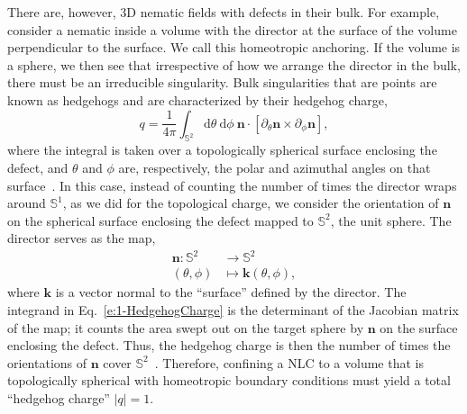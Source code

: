 There are, however, 3D nematic fields with defects in their bulk.
For example, consider a nematic inside a volume with the director at the surface of the volume perpendicular to the surface.
We call this homeotropic anchoring.
If the volume is a sphere, we then see that irrespective of how we arrange the director in the bulk, there must be an irreducible singularity.
Bulk singularities that are points are known as hedgehogs and are characterized by their hedgehog charge,
\begin{equation}
  q = \frac{1}{4 \pi} \int_{\mathbb{S}^2} \textrm{d}\theta \: \textrm{d}\phi \: \mathbf{n} \cdot \left [ \partial_{\theta} \mathbf{n} \times \partial_{\phi} \mathbf{n} \right ],\label{e:1-HedgehogCharge}
\end{equation}
where the integral is taken over a topologically spherical surface enclosing the defect, and $\theta$ and $\phi$ are, respectively, the polar and azimuthal angles on that surface~\cite{RN153}.
In this case, instead of counting the number of times the director wraps around $\mathbb{S}^1$, as we did for the topological charge, we consider the orientation of $\mathbf{n}$ on the spherical surface enclosing the defect mapped to $\mathbb{S}^2$, the unit sphere.
The director serves as the map,
\begin{align}
  \mathbf{n} : \mathbb{S}^2 &\rightarrow \mathbb{S}^2 \nonumber \\
               (\theta, \phi) &\mapsto \mathbf{k}(\theta,\phi), \nonumber
\end{align}
where $\mathbf{k}$ is a vector normal to the ``surface'' defined by the director.
The integrand in Eq.~\ref{e:1-HedgehogCharge} is the determinant of the Jacobian matrix of the map; it counts the area swept out on the target sphere by $\mathbf{n}$ on the surface enclosing the defect.
Thus, the hedgehog charge is then the number of times the orientations of $\mathbf{n}$ cover $\mathbb{S}^2$~\cite{RN153}.
Therefore, confining a NLC to a volume that is topologically spherical with homeotropic boundary conditions must yield a total ``hedgehog charge'' $|q|=1$.

